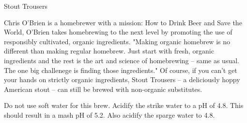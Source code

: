 \begin{recipie}{Stout Trousers}

\begin{aboutblock}
Chris O'Brien is a homebrewer with a mission: How to Drink
Beer and Save the World, O'Brien takes homebrewing to the next level
by promoting the use of responsibly cultivated, organic ingredients.
"Making organic homebrew is no different than making regular homebrew.
Just start with fresh, organic ingredients and the rest is the art and
science of homebrewing -- same as usual. The one big challenege is finding those ingredients." Of course, if you can't get your hands on strictly
organic ingredients, Stout Trousers -- a deliciously hoppy American
stout -- can still be brewed with non-organic substitutes.
\end{aboutblock}


\begin{methodandtiming}
 
\begin{mashsteps}
\end{mashsteps}

\begin{fermentationsteps}
\end{fermentationsteps}

\begin{directions}
Do not use soft water for this brew. Acidify the strike water to a pH of 4.8.
This should result in a mash pH of 5.2. Also acidify the sparge water to 4.8.
\end{directions}

\end{methodandtiming}

\pagebreak

\begin{ingredientsblock}

\begin{malts}
\end{malts}


\end{ingredientsblock}
\end{recipie}
